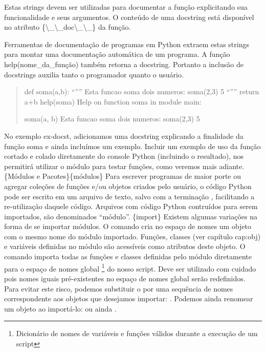 \documentclass[a4paper,10pt,brazil]{sphinxmanual}
\begin{document}
Estas strings devem ser utilizadas para documentar a função
explicitando sua funcionalidade e seus argumentos. O conteúdo de
uma docstring está disponível no atributo \{\textbackslash{}\_\textbackslash{}\_doc\textbackslash{}\_\textbackslash{}\_\} da
função.

Ferramentas de documentação de programas em Python extraem estas
strings para montar uma documentação automática de um programa. A
função help(nome\_da\_função) também retorna a docstring. Portanto
a inclusão de docstrings auxilia tanto o programador quanto o
usuário.
\begin{quote}

def soma(a,b): ``'''' Esta funcao soma dois numeros: soma(2,3) 5 ``''''
return a+b help(soma) Help on function soma in module main:

soma(a, b) Esta funcao soma dois numeros: soma(2,3) 5
\end{quote}

No exemplo ex-docst, adicionamos uma docstring explicando a
finalidade da função soma e ainda incluímos um exemplo. Incluir um
exemplo de uso da função cortado e colado diretamente do console
Python (incluindo o resultado), nos permitirá utilizar o módulo
 para testar funções, como veremos mais adiante.
\{Módulos e Pacotes\}\{módulos\} Para escrever programas de maior porte
ou agregar coleções de funções e/ou objetos criados pelo usuário, o
código Python pode ser escrito em um arquivo de texto, salvo com a
terminação , facilitando a re-utilização daquele código.
Arquivos com código Python contruídos para serem importados, são
denominados ``módulo''. \{import\} Existem algumas variações na forma
de se importar módulos. O comando  cria no
espaço de nomes um objeto com o mesmo nome do módulo importado.
Funções, classes (ver capítulo cap:obj) e variáveis definidas no
módulo são acessíveis como atributos deste objeto. O comando
 importa todas as funções e classes
definidas pelo módulo diretamente para o espaço de nomes
global \footnote{
Dicionário de nomes de variáveis e funções válidos durante a
execução de um script
} do nosso script. Deve ser utilizado com cuidado pois
nomes iguais pré-existentes no espaço de nomes global serão
redefinidos. Para evitar este risco, podemos substituir o \code{*} por
uma sequência de nomes correspondente aos objetos que desejamos
importar: . Podemos ainda
renomear um objeto ao importá-lo:  ou ainda
.
\end{document}
